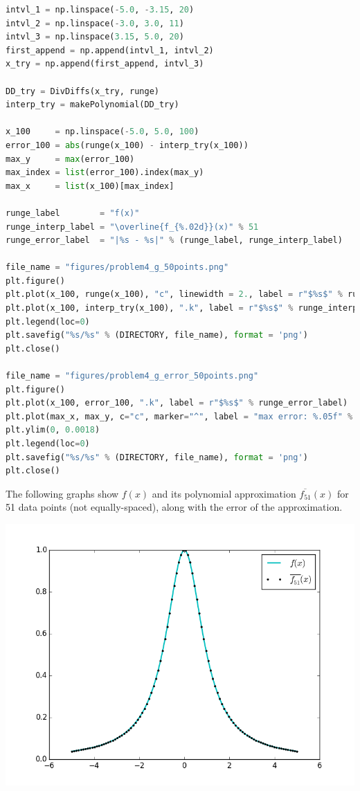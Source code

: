 \documentclass[12pt]{article}
\begin{document}
\begin{lstlisting}[language=Python, caption=Attempting Different Data Sets for Better Approximations]
intvl_1 = np.linspace(-5.0, -3.15, 20)
intvl_2 = np.linspace(-3.0, 3.0, 11)
intvl_3 = np.linspace(3.15, 5.0, 20)
first_append = np.append(intvl_1, intvl_2)
x_try = np.append(first_append, intvl_3)

DD_try = DivDiffs(x_try, runge)
interp_try = makePolynomial(DD_try)

x_100     = np.linspace(-5.0, 5.0, 100)
error_100 = abs(runge(x_100) - interp_try(x_100))
max_y     = max(error_100)
max_index = list(error_100).index(max_y)
max_x     = list(x_100)[max_index]

runge_label        = "f(x)"
runge_interp_label = "\overline{f_{%.02d}}(x)" % 51
runge_error_label  = "|%s - %s|" % (runge_label, runge_interp_label)

file_name = "figures/problem4_g_50points.png"
plt.figure()
plt.plot(x_100, runge(x_100), "c", linewidth = 2., label = r"$%s$" % runge_label)
plt.plot(x_100, interp_try(x_100), ".k", label = r"$%s$" % runge_interp_label)
plt.legend(loc=0)
plt.savefig("%s/%s" % (DIRECTORY, file_name), format = 'png')
plt.close()

file_name = "figures/problem4_g_error_50points.png"
plt.figure()
plt.plot(x_100, error_100, ".k", label = r"$%s$" % runge_error_label)
plt.plot(max_x, max_y, c="c", marker="^", label = "max error: %.05f" % max_y)
plt.ylim(0, 0.0018)
plt.legend(loc=0)
plt.savefig("%s/%s" % (DIRECTORY, file_name), format = 'png')
plt.close()
\end{lstlisting}
\noindent The following graphs show $f(x)$ and its polynomial approximation $\overline{f_{51}}(x)$ for 51 data points (not equally-spaced), along with the error of the approximation.\\
\centerline{\includegraphics[scale=0.65]{figures/problem4_g_51points.png}}\\
\end{document}
